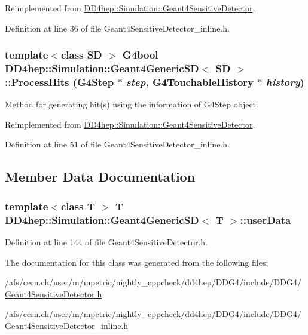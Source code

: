 Reimplemented from \hyperlink{class_d_d4hep_1_1_simulation_1_1_geant4_sensitive_detector_a7ee158e29937473f04db1cc6c7284923}{DD4hep::Simulation::Geant4SensitiveDetector}.

Definition at line 36 of file Geant4SensitiveDetector\_\-inline.h.\hypertarget{class_d_d4hep_1_1_simulation_1_1_geant4_generic_s_d_aecea47598186c697197f51c683f13bbb}{
\subsubsection[{ProcessHits}]{\setlength{\rightskip}{0pt plus 5cm}template$<$class SD $>$ G4bool {\bf DD4hep::Simulation::Geant4GenericSD}$<$ SD $>$::ProcessHits (G4Step $\ast$ {\em step}, \/  G4TouchableHistory $\ast$ {\em history})}}
\label{class_d_d4hep_1_1_simulation_1_1_geant4_generic_s_d_aecea47598186c697197f51c683f13bbb}


Method for generating hit(s) using the information of G4Step object. 

Reimplemented from \hyperlink{class_d_d4hep_1_1_simulation_1_1_geant4_sensitive_detector_ac889694c4406ea089f3172b73da49134}{DD4hep::Simulation::Geant4SensitiveDetector}.

Definition at line 51 of file Geant4SensitiveDetector\_\-inline.h.

\subsection{Member Data Documentation}
\hypertarget{class_d_d4hep_1_1_simulation_1_1_geant4_generic_s_d_a95379cb6ef1953981bd7f12039299e47}{
\subsubsection[{userData}]{\setlength{\rightskip}{0pt plus 5cm}template$<$class T $>$ T {\bf DD4hep::Simulation::Geant4GenericSD}$<$ T $>$::{\bf userData}}}
\label{class_d_d4hep_1_1_simulation_1_1_geant4_generic_s_d_a95379cb6ef1953981bd7f12039299e47}


Definition at line 144 of file Geant4SensitiveDetector.h.

The documentation for this class was generated from the following files:\begin{DoxyCompactItemize}
\item 
/afs/cern.ch/user/m/mpetric/nightly\_\-cppcheck/dd4hep/DDG4/include/DDG4/\hyperlink{_geant4_sensitive_detector_8h}{Geant4SensitiveDetector.h}\item 
/afs/cern.ch/user/m/mpetric/nightly\_\-cppcheck/dd4hep/DDG4/include/DDG4/\hyperlink{_geant4_sensitive_detector__inline_8h}{Geant4SensitiveDetector\_\-inline.h}\end{DoxyCompactItemize}

